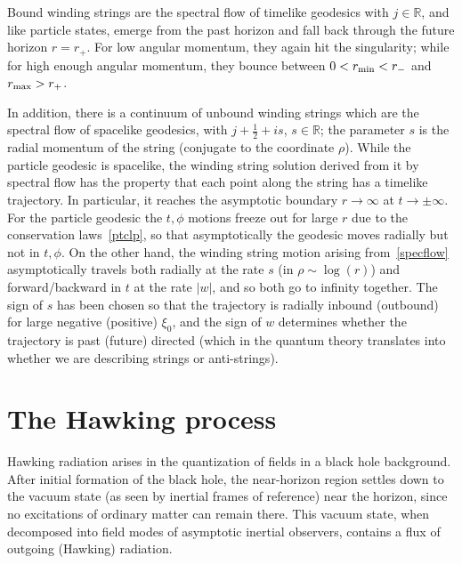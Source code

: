 \documentclass[11pt]{article}
\def\half{\frac12}
\newcommand{\bR}{{\mathbb R}}
\numberwithin{equation}{section}
\def\half{\frac12}
\begin{document}
Bound winding strings are the spectral flow of timelike geodesics with $j\in\bR$, and like particle states, emerge from the past horizon and fall back through the future horizon $r=r_+$.  For low angular momentum, they again hit the singularity; while for high enough angular momentum, they bounce between $0<r_{\rm min}<r_-$ and $r_{\rm max}>r_+$.  

In addition, there is a continuum of unbound winding strings which are the spectral flow of spacelike geodesics, with $j+\half+is$, $s\in\bR$; the parameter $s$ is the radial momentum of the string (conjugate to the coordinate $\rho$).  
While the particle geodesic is spacelike, the winding string solution derived from it by spectral flow has the property that each point along the string has a timelike trajectory.  In particular, it reaches the asymptotic boundary $r\to\infty$ at $t\to\pm\infty$.  For the particle geodesic the $t,\phi$ motions freeze out for large $r$ due to the conservation laws~\eqref{ptclp}, so that asymptotically the geodesic moves radially but not in $t,\phi$.  On the other hand, the winding string motion arising from~\eqref{specflow} asymptotically travels both radially at the rate $s$ (in $\rho\sim \log(r)$) and forward/backward in $t$ at the rate $|w|$, and so both go to infinity together.  The sign of $s$ has been chosen so that the trajectory is radially inbound (outbound) for large negative (positive) $\xi_0$, and the sign of $w$ determines whether the trajectory is past (future) directed (which in the quantum theory translates into whether we are describing strings or anti-strings).







\section{The Hawking process}
\label{sec:hawking}

Hawking radiation arises in the quantization of fields in a black hole background.  After initial formation of the black hole, the near-horizon region settles down to the vacuum state (as seen by inertial frames of reference) near the horizon, since no excitations of ordinary matter can remain there.  This vacuum state, when decomposed into field modes of asymptotic inertial observers, contains a flux of outgoing (Hawking) radiation.
\end{document}
